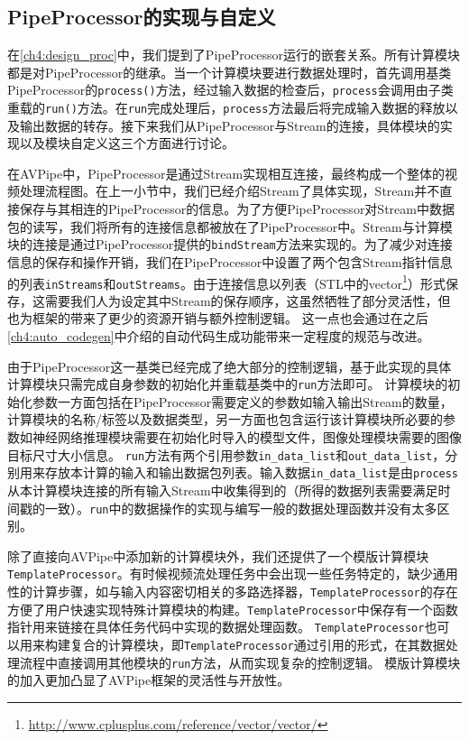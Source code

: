 \subsection{PipeProcessor的实现与自定义}
在\ref{ch4:design_proc}中，我们提到了PipeProcessor运行的嵌套关系。所有计算模块都是对PipeProcessor的继承。当一个计算模块要进行数据处理时，首先调用基类PipeProcessor的\texttt{process()}方法，经过输入数据的检查后，\texttt{process}会调用由子类重载的\texttt{run()}方法。在\texttt{run}完成处理后，\texttt{process}方法最后将完成输入数据的释放以及输出数据的转存。接下来我们从PipeProcessor与Stream的连接，具体模块的实现以及模块自定义这三个方面进行讨论。\par
在AVPipe中，PipeProcessor是通过Stream实现相互连接，最终构成一个整体的视频处理流程图。在上一小节中，我们已经介绍Stream了具体实现，Stream并不直接保存与其相连的PipeProcessor的信息。为了方便PipeProcessor对Stream中数据包的读写，我们将所有的连接信息都被放在了PipeProcessor中。Stream与计算模块的连接是通过PipeProcessor提供的\texttt{bindStream}方法来实现的。为了减少对连接信息的保存和操作开销，我们在PipeProcessor中设置了两个包含Stream指针信息的列表\texttt{inStreams}和\texttt{outStreams}。由于连接信息以列表（STL中的vector\footnote{\url{http://www.cplusplus.com/reference/vector/vector/}}）形式保存，这需要我们人为设定其中Stream的保存顺序，这虽然牺牲了部分灵活性，但也为框架的带来了更少的资源开销与额外控制逻辑。
这一点也会通过在之后\ref{ch4:auto_codegen}中介绍的自动代码生成功能带来一定程度的规范与改进。
\par
由于PipeProcessor这一基类已经完成了绝大部分的控制逻辑，基于此实现的具体计算模块只需完成自身参数的初始化并重载基类中的\texttt{run}方法即可。
计算模块的初始化参数一方面包括在PipeProcessor需要定义的参数如输入输出Stream的数量，计算模块的名称/标签以及数据类型，另一方面也包含运行该计算模块所必要的参数如神经网络推理模块需要在初始化时导入的模型文件，图像处理模块需要的图像目标尺寸大小信息。
\texttt{run}方法有两个引用参数\texttt{in\_data\_list}和\texttt{out\_data\_list}，分别用来存放本计算的输入和输出数据包列表。输入数据\texttt{in\_data\_list}是由\texttt{process}从本计算模块连接的所有输入Stream中收集得到的（所得的数据列表需要满足时间戳的一致）。\texttt{run}中的数据操作的实现与编写一般的数据处理函数并没有太多区别。\par
除了直接向AVPipe中添加新的计算模块外，我们还提供了一个模版计算模块\texttt{TemplateProcessor}。有时候视频流处理任务中会出现一些任务特定的，缺少通用性的计算步骤，如与输入内容密切相关的多路选择器，\texttt{TemplateProcessor}的存在方便了用户快速实现特殊计算模块的构建。\texttt{TemplateProcessor}中保存有一个函数指针用来链接在具体任务代码中实现的数据处理函数。
\texttt{TemplateProcessor}也可以用来构建复合的计算模块，即\texttt{TemplateProcessor}通过引用的形式，在其数据处理流程中直接调用其他模块的\texttt{run}方法，从而实现复杂的控制逻辑。
模版计算模块的加入更加凸显了AVPipe框架的灵活性与开放性。

